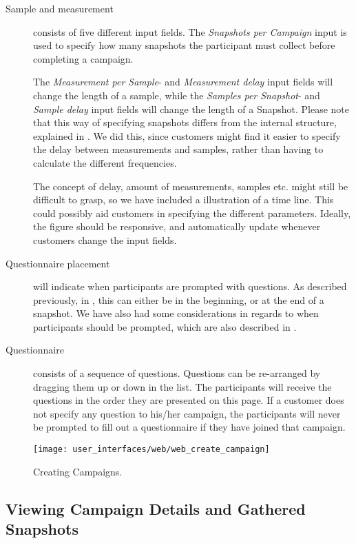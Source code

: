 \begin{description}
    \item[Sample and measurement] consists of five different input fields. The \emph{Snapshots per Campaign} input is used to specify how many snapshots the participant must collect before completing a campaign.

    The \emph{Measurement per Sample}- and \emph{Measurement delay} input fields will change the length of a sample, while the \emph{Samples per Snapshot}- and \emph{Sample delay} input fields will change the length of a Snapshot. Please note that this way of specifying snapshots differs from the internal structure, explained in . We did this, since customers might find it easier to specify the delay between measurements and samples, rather than having to calculate the different frequencies.

    The concept of delay, amount of measurements, samples etc. might still be difficult to grasp, so we have included a illustration of a time line. This could possibly aid customers in specifying the different parameters. Ideally, the figure should be responsive, and automatically update whenever customers change the input fields.

    \item[Questionnaire placement] will indicate when participants are prompted with questions. As described previously, in , this can either be in the beginning, or at the end of a snapshot. We have also had some considerations in regards to when participants should be prompted, which are also described in .

    \item[Questionnaire] consists of a sequence of questions. Questions can be re-arranged by dragging them up or down in the list. The participants will receive the questions in the order they are presented on this page. If a customer does not specify any question to his/her campaign, the participants will never be prompted to fill out a questionnaire if they have joined that campaign.
\end{description}

\begin{figure}[!htbp]
\centering
\texttt{[image: user\_interfaces/web/web\_create\_campaign]}
\caption{Creating Campaigns.}
\label{fig:web_create_campaign}
\end{figure}
\FloatBarrier

\subsection{Viewing Campaign Details and Gathered Snapshots}
\label{sub:viewing_campaign_details}

